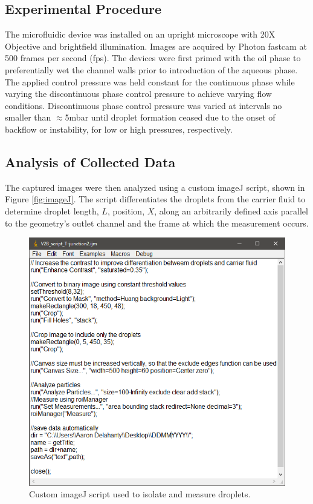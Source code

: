 \subsection{Experimental Procedure}

The microfluidic device was installed on an upright microscope with 20X Objective and brightfield illumination. Images are acquired by Photon fastcam at 500 frames per second (fps). The devices were first primed with the oil phase to preferentially wet the channel walls prior to introduction of the aqueous phase. The applied control pressure was held constant for the continuous phase while varying the discontinuous phase control pressure to achieve varying flow conditions. Discontinuous phase control pressure was varied at intervals no smaller than $\approx$5mbar until droplet formation ceased due to the onset of backflow or instability, for low or high pressures, respectively. 

\subsection{Analysis of Collected Data}

The captured images were then analyzed using a custom imageJ script, shown in Figure \vref{fig:imageJ}. The script differentiates the droplets from the carrier fluid to determine droplet length, $L$,  position, $X$, along an arbitrarily defined axis parallel to the geometry's outlet channel and the frame at which the measurement occurs.

\begin{figure}[H]
\centering 
\includegraphics[width=01.0\columnwidth]{imageJ.PNG} 
\caption[Custom ImageJ Droplet Analysis Script]{Custom imageJ script used to isolate and measure droplets.} 
\label{fig:imageJ} 
\end{figure}


